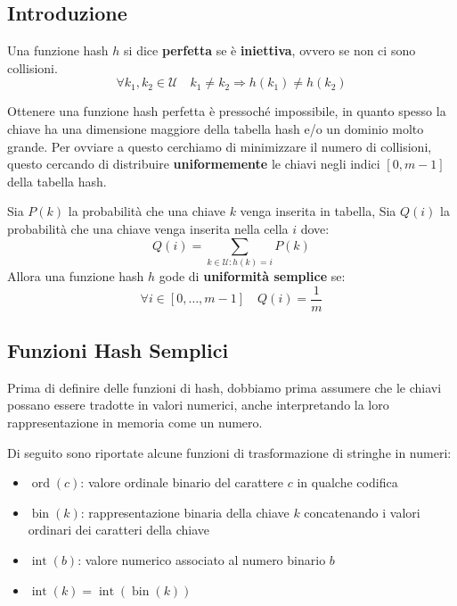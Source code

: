     \subsection{Introduzione}
        \begin{definition}
            Una funzione hash $h$ si dice \textbf{perfetta} se è \textbf{iniettiva}, ovvero se non ci sono collisioni.
            $$
                \forall k_1, k_2 \in \mathcal{U} \quad k_1 \neq k_2 \Rightarrow h(k_1) \neq h(k_2)
            $$
        \end{definition}
        Ottenere una funzione hash perfetta è pressoché impossibile, in quanto spesso la chiave ha una dimensione maggiore della tabella hash e/o un dominio molto grande.\newline
        Per ovviare a questo cerchiamo di minimizzare il numero di collisioni, questo cercando di distribuire \textbf{uniformemente} le chiavi negli indici $[0, m-1]$ della tabella hash.
        \begin{definition}
            Sia $P(k)$ la probabilità che una chiave $k$ venga inserita in tabella,\newline
            Sia $Q(i)$ la probabilità che una chiave venga inserita nella cella $i$ dove:
            $$
                Q(i) = \sum_{k \in \mathcal{U}:h(k)=i} P(k)
            $$
            Allora una funzione hash $h$ gode di \textbf{uniformità semplice} se:
            $$
                \forall i \in [0,\dots ,m-1] \quad Q(i) = \frac{1}{m}
            $$
        \end{definition}
    
    \subsection{Funzioni Hash Semplici}
        Prima di definire delle funzioni di hash, dobbiamo prima assumere che le chiavi possano essere tradotte in valori numerici, anche interpretando la loro rappresentazione in memoria come un numero.
        \begin{example}
            Di seguito sono riportate alcune funzioni di trasformazione di stringhe in numeri:
            \begin{itemize}
                \item $\operatorname{ord}(c)$: valore ordinale binario del carattere $c$ in qualche codifica
                \item $\operatorname{bin}(k)$: rappresentazione binaria della chiave $k$ concatenando i valori ordinari dei caratteri della chiave
                \item $\operatorname{int}(b)$: valore numerico associato al numero binario $b$
                \item $\operatorname{int}(k) = \operatorname{int}(\operatorname{bin}(k))$
            \end{itemize}
        \end{example}

